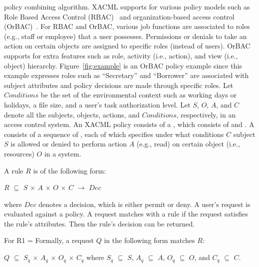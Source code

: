 policy combining algorithm.
XACML supports for various policy models such as Role Based Access Control (RBAC)~\cite{anderson04:rbacxacml,ferraiolo01:proposed} and organization-based access control (OrBAC)~\cite{kalam03:orBac}. For RBAC and OrBAC, various job functions are associated to roles (e.g., staff or employee) that a user possesses. Permissions or denials to take an action on certain objects are assigned to specific roles (instead of users). OrBAC supports for 
extra features such as role, activity (i.e., action), and view (i.e., object) hierarchy. Figure~\ref{fig:example} is an OrBAC policy example since this example expresses roles such as ``Secretary'' and ``Borrower'' are associated with subject attributes and policy decisions are made through specific roles.
Let $Conditions$ be the set of the environmental context
such as working days or holidays, a file size, and a user's task authorization level. 
Let $S$, $O$, $A$, and $C$ denote all the subjects,
objects, actions, and  $Conditions$, respectively, in an access control system.
An XACML policy consists of a , which consists
of  and . A  consists
of a sequence of , each of which
specifies under what conditions $C$ subject $S$ is allowed or denied
to perform action $A$ (e.g., read) on certain object (i.e., resources) $O$ in a system.

A rule $R$ is of the following form:
\begin{center}
$R$ $\subseteq$ $S$ $\times$ $A$ $\times$ $O$ $\times$ $C$ $\longrightarrow$ $Dec$
\end{center}
where $Dec$ denotes a decision, which is either permit or deny.
A user's request is evaluated against a policy.
A request matches with a rule if the request satisfies the rule's
attributes. Then the rule's decision can be returned.

For R1 = 
Formally, a request $Q$ in the following form matches $R$:
\begin{center}
$Q$ $\subseteq$ $S_q$ $\times$ $A_q$ $\times$ $O_q$ $\times$ $C_q$ where $S_q$ $\subseteq$ $S$, $A_q$ $\subseteq$ $A$, $O_q$ $\subseteq$ $O$, and $C_q$ $\subseteq$ $C$.
\end{center}


